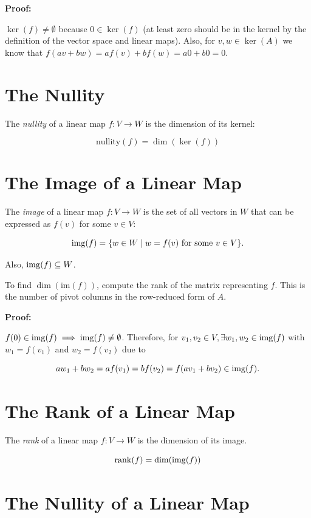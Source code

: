 \textbf{Proof:}

\(\ker(f) \ne \emptyset \) because \(0 \in \ker(f)\) (at least zero should be in the kernel by the definition of the vector space and linear maps). 
Also, for \(v, w \in \ker(A)\) we know that \(f(av + bw) = af(v) + bf(w) = a0 + b0 = 0\). 

\QED

\section{The Nullity}

The \emph{nullity} of a linear map \( f: V \to W \) is the dimension of its kernel:

\[
    \mathrm{nullity}(f) = \dim(\ker(f))
\]

\section{The Image of a Linear Map}

The \emph{image} of a linear map \( f: V \to W \) is the set of all vectors in \( W \) that can be expressed 
as \( f(v) \) for some \( v \in V \):

\[
    \mathrm{img}(f) = \{ w \in W \mid w = f(v) \text{ for some } v \in V \}.
\]

Also, \(\mathrm{img}(f) \subseteq W\).

To find \( \dim(\text{im}(f)) \), compute the rank of the matrix representing \( f \). This 
is the number of pivot columns in the row-reduced form of \( A \).

\textbf{Proof:}

\(f(0) \in \mathrm{img}(f) \implies \mathrm{img}(f) \ne \emptyset\). Therefore, for \(v_1,v_2 \in V, \exists w_1, w_2 \in \mathrm{img}(f)\) with 
\(w_1 = f(v_1)\) and \(w_2 = f(v_2)\) due to 

\[
    aw_1 + bw_2 = af(v_1) = bf(v_2) = f(av_1 + bv_2) \in \mathrm{img}(f).
\]

\QED 

\section{The Rank of a Linear Map}

The \emph{rank} of a linear map \( f: V \to W \) is the dimension of its image.

\[
    \mathrm{rank}(f) = \dim(\mathrm{img}(f))
\]

\section{The Nullity of a Linear Map}

